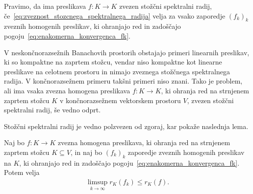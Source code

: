 \documentclass[mat2, tisk]{fmfdelo}
\begin{document}
\begin{definicija}
  Pravimo, da ima preslikava $f\colon K\longrightarrow K$ zvezen stožčni
  spektralni radij, če~\eqref{eq:zveznost_stozcnega_spektralnega_radija}
  velja za vsako zaporedje $(f_k)_k$ zveznih homogenih preslikav, ki
  ohranjajo red in zadoščajo pogoju~\eqref{eq:enakomerna_konvergenca_fk}.
\end{definicija}


V neskončnorazsežnih Banachovih prostorih obstajajo primeri linearnih
preslikav, ki so kompaktne na zaprtem stožcu, vendar niso kompaktne kot
linearne preslikave na celotnem prostoru in nimajo zveznega stožčnega
spektralnega radija. V končnorazsežnem primeru takšni primeri niso znani.
Tako je problem, ali ima vsaka zvezna homogena preslikava
$f\colon K\longrightarrow K$, ki ohranja red na strnjenem zaprtem stožcu
$K$ v končnorazsežnem vektorskem prostoru $V$, zvezen stožčni spektralni
radij, še vedno odprt.

Stožčni spektralni radij je vedno polzvezen od zgoraj, kar pokaže
naslednja lema.

\begin{lema}\label{lema:zgornja_polzveznost_stozcnega_spektralnega_radija}
  Naj bo $f\colon K\longrightarrow K$ zvezna homogena preslikava, ki
  ohranja red na strnjenem zaprtem stožcu $K\subseteq V$, in naj bo
  $(f_k)_k$ zaporedje zveznih homogenih preslikav na $K$, ki ohranjajo
  red in zadoščajo pogoju~\eqref{eq:enakomerna_konvergenca_fk}. Potem velja
  \begin{align*}
  \limsup_{k\to\infty}r_K(f_k)\leq r_K(f).
  \end{align*}
\end{lema}
\end{document}
